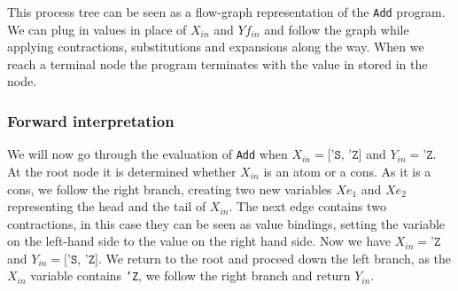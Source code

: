 \documentclass[10pt]{../sigplanconf}
\begin{document}
This process tree can be seen as a flow-graph representation of the
\texttt{Add} program. We can plug in values in place of $X_{in}$ and
$Yf_{in}$ and follow the graph while applying contractions,
substitutions and expansions along the way. When we reach a terminal
node the program terminates with the value in stored in the node.

\subsubsection{Forward interpretation}
We will now go through the evaluation of \texttt{Add} when $X_{in} =
\texttt{['S, 'Z]}$ and $Y_{in} = \texttt{'Z}$. At the root node it is
determined whether $X_{in}$ is an atom or a cons. As it is a cons, we
follow the right branch, creating two new variables $Xe_1$ and $Xe_2$
representing the head and the tail of $X_{in}$. The next edge contains
two contractions, in this case they can be seen as value bindings,
setting the variable on the left-hand side to the value on the right
hand side. Now we have $X_{in} = \texttt{'Z}$ and $Y_{in} =
\texttt{['S, 'Z]}$. We return to the root and proceed down the left
branch, as the $X_{in}$ variable contains \texttt{'Z}, we follow the
right branch and return $Y_{in}$.
\end{document}
